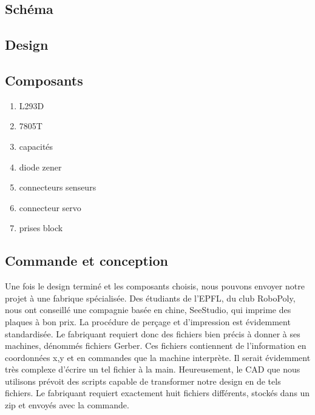 \documentclass[a4paper,12pt]{report}
\begin{document}
{%
\subsection{Schéma}
\subsection{Design}
\subsection{Composants}
\begin{enumerate}
\item L293D
\item 7805T
\item capacités
\item diode zener
\item connecteurs senseurs
\item connecteur servo
\item prises block
\end{enumerate}
\subsection{Commande et conception}
Une fois le design terminé et les composants choisis, nous pouvons envoyer
notre projet à une fabrique spécialisée. Des étudiants de l'EPFL, du club
RoboPoly, nous ont conseillé une compagnie basée en chine, SeeStudio, qui imprime des
plaques à bon prix. La procédure de perçage et d'impression est évidemment
standardisée. Le fabriquant requiert donc des fichiers bien précis à donner à
ses machines, dénommés fichiers Gerber. Ces fichiers contiennent de
l'information en coordonnées x,y et en commandes que la machine interprète. Il
serait évidemment très complexe d'écrire un tel fichier à la
main. Heureusement, le CAD que nous utilisons prévoit des scripts capable de
transformer notre design en de tels fichiers. Le fabriquant requiert
exactement huit fichiers différents, stockés dans un zip et envoyés avec la commande.  

}
\end{document}
